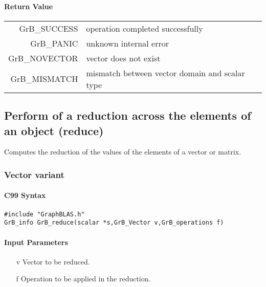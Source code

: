\documentclass[11pt]{extarticle}
\begin{document}
\paragraph{Return Value}

\begin{tabular}{rl}
{\sf GrB\_SUCCESS}	& operation completed successfully \\
{\sf GrB\_PANIC}	& unknown internal error \\
{\sf GrB\_NOVECTOR}	& vector does not exist \\
{\sf GrB\_MISMATCH}	& mismatch between vector domain and scalar type \\
\end{tabular}

\subsection{Perform of a reduction across the elements of an object ({\sf reduce})}

Computes the reduction of the values of the elements of a vector or matrix.

\subsubsection{Vector variant}

\paragraph{C99 Syntax}

\begin{verbatim}
#include "GraphBLAS.h"
GrB_info GrB_reduce(scalar *s,GrB_Vector v,GrB_operations f)
\end{verbatim}



\paragraph{Input Parameters}

\begin{itemize}
	\item[{\sf v}] Vector to be reduced.
	\item[{\sf f}] Operation to be applied in the reduction.
\end{itemize}
\end{document}
